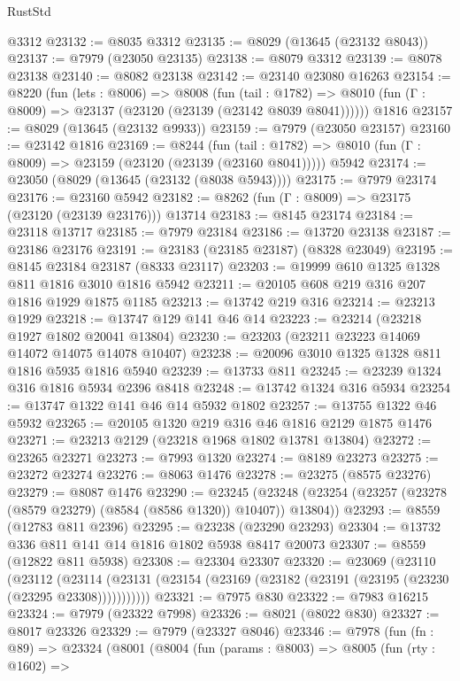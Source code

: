 \begin{lexlean}{RustStd}
\begin{coremodule}
    @3312
@23132 := @8035 @3312
@23135 := @8029 (@13645 (@23132 @8043))
@23137 := @7979 (@23050 @23135)
@23138 := @8079 @3312
@23139 := @8078 @23138
@23140 := @8082 @23138
@23142 := @23140 @23080 @16263
@23154 := @8220
    (fun (lets : @8006) =>
    @8008
      (fun (tail : @1782) =>
      @8010 (fun (Γ : @8009) => @23137 (@23120 (@23139 (@23142 @8039 @8041))))))
    @1816
@23157 := @8029 (@13645 (@23132 @9933))
@23159 := @7979 (@23050 @23157)
@23160 := @23142 @1816
@23169 := @8244
    (fun (tail : @1782) => @8010 (fun (Γ : @8009) => @23159 (@23120 (@23139 (@23160 @8041)))))
    @5942
@23174 := @23050 (@8029 (@13645 (@23132 (@8038 @5943))))
@23175 := @7979 @23174
@23176 := @23160 @5942
@23182 := @8262 (fun (Γ : @8009) => @23175 (@23120 (@23139 @23176))) @13714
@23183 := @8145 @23174
@23184 := @23118 @13717
@23185 := @7979 @23184
@23186 := @13720 @23138
@23187 := @23186 @23176
@23191 := @23183 (@23185 @23187) (@8328 @23049)
@23195 := @8145 @23184 @23187 (@8333 @23117)
@23203 := @19999 @610 @1325 @1328 @811 @1816 @3010 @1816 @5942
@23211 := @20105 @608 @219 @316 @207 @1816 @1929 @1875 @1185
@23213 := @13742 @219 @316
@23214 := @23213 @1929
@23218 := @13747 @129 @141 @46 @14
@23223 := @23214 (@23218 @1927 @1802 @20041 @13804)
@23230 := @23203 (@23211 @23223 @14069 @14072 @14075 @14078 @10407)
@23238 := @20096 @3010 @1325 @1328 @811 @1816 @5935 @1816 @5940
@23239 := @13733 @811
@23245 := @23239 @1324 @316 @1816 @5934 @2396 @8418
@23248 := @13742 @1324 @316 @5934
@23254 := @13747 @1322 @141 @46 @14 @5932 @1802
@23257 := @13755 @1322 @46 @5932
@23265 := @20105 @1320 @219 @316 @46 @1816 @2129 @1875 @1476
@23271 := @23213 @2129 (@23218 @1968 @1802 @13781 @13804)
@23272 := @23265 @23271
@23273 := @7993 @1320
@23274 := @8189 @23273
@23275 := @23272 @23274
@23276 := @8063 @1476
@23278 := @23275 (@8575 @23276)
@23279 := @8087 @1476
@23290 := @23245
    (@23248 (@23254 (@23257 (@23278 (@8579 @23279) (@8584 (@8586 @1320)) @10407)) @13804))
@23293 := @8559 (@12783 @811 @2396)
@23295 := @23238 (@23290 @23293)
@23304 := @13732 @336 @811 @141 @14 @1816 @1802 @5938 @8417 @20073
@23307 := @8559 (@12822 @811 @5938)
@23308 := @23304 @23307
@23320 := @23069
    (@23110
      (@23112
        (@23114 (@23131 (@23154 (@23169 (@23182 (@23191 (@23195 (@23230 (@23295 @23308)))))))))))
@23321 := @7975 @830
@23322 := @7983 @16215
@23324 := @7979 (@23322 @7998)
@23326 := @8021 (@8022 @830)
@23327 := @8017 @23326
@23329 := @7979 (@23327 @8046)
@23346 := @7978
    (fun (fn : @89) =>
    @23324
      (@8001
        (@8004
          (fun (params : @8003) =>
          @8005
            (fun (rty : @1602) =>

\end{coremodule}
\end{lexlean}
